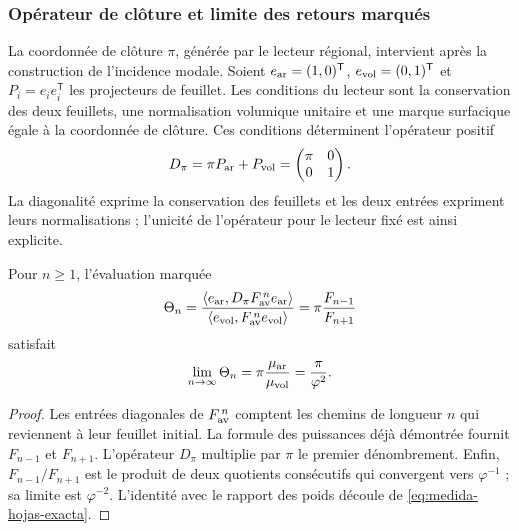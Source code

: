 \subsubsection{Opérateur de clôture et limite des retours marqués}
\label{sec:operador-retorno-marcado}

La coordonnée de clôture \(\pi\), générée par le lecteur régional, intervient après la construction de l'incidence modale. Soient \(e_{\rm ar}=(1,0)^{\mathsf T}\), \(e_{\rm vol}=(0,1)^{\mathsf T}\) et \(P_i=e_ie_i^{\mathsf T}\) les projecteurs de feuillet. Les conditions du lecteur sont la conservation des deux feuillets, une normalisation volumique unitaire et une marque surfacique égale à la coordonnée de clôture. Ces conditions déterminent l'opérateur positif
\begin{equation}
 D_\pi=\pi P_{\rm ar}+P_{\rm vol}
       =\begin{pmatrix}\pi&0\\0&1\end{pmatrix}.
 \label{eq:operador-marca-pi}
\end{equation}
La diagonalité exprime la conservation des feuillets et les deux entrées
expriment leurs normalisations ; l'unicité de
l'opérateur pour le lecteur fixé est ainsi explicite.

\begin{proposition}
Pour \(n\geq1\), l'évaluation marquée
\begin{equation}
 \Theta_n=
 \frac{\langle e_{\rm ar},D_\pi F_{\rm av}^{\,n}e_{\rm ar}\rangle}
 {\langle e_{\rm vol},F_{\rm av}^{\,n}e_{\rm vol}\rangle}
 =\pi\frac{F_{n-1}}{F_{n+1}}
 \label{eq:retorno-marcado-finito}
\end{equation}
satisfait
\begin{equation}
 \lim_{n\to\infty}\Theta_n
 =\pi\frac{\mu_{\rm ar}}{\mu_{\rm vol}}
 =\frac{\pi}{\varphi^2}.
 \label{eq:retorno-marcado-limite}
\end{equation}
\end{proposition}
\begin{proof}
Les entrées diagonales de \(F_{\rm av}^{\,n}\) comptent les chemins
de longueur \(n\) qui reviennent à leur feuillet initial. La formule des puissances
déjà démontrée fournit \(F_{n-1}\) et \(F_{n+1}\). L'opérateur
\(D_\pi\) multiplie par \(\pi\) le premier dénombrement. Enfin,
\(F_{n-1}/F_{n+1}\) est le produit de deux quotients consécutifs
qui convergent vers \(\varphi^{-1}\) ; sa limite est
\(\varphi^{-2}\). L'identité avec le rapport des poids découle de
\eqref{eq:medida-hojas-exacta}.
\end{proof}

